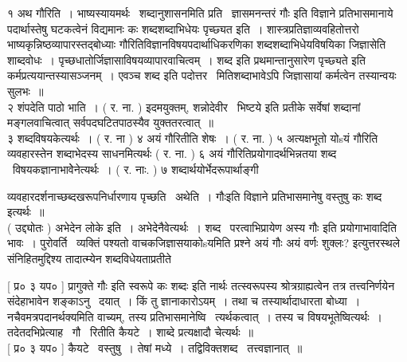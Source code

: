 \documentclass[11pt, openany]{book}
\begin{document}
\begin{multicols}{2}
१ अथ गौरिति~। भाष्यस्यायमर्थः \textendash\ शब्दानुशासनमिति प्रति \textendash\ ज्ञासमनन्तरं {\qt गौः} इति विज्ञाने प्रतिभासमानाये पदार्थास्तेषु घटकत्वेनं विद्यमानः कः शब्दशब्दाभिधेयः पृच्छ्यत इति~। शास्त्रप्रतिज्ञाव्यवहितोत्तरो भाष्यकृन्निष्ठव्यापारस्तद्बोध्याः गौरितिविज्ञानविषयपदार्थाधिकरणिका शब्दशब्दाभिधेयविषयिका जिज्ञासेति शाब्दवोधः~। पृच्छधातोर्जिज्ञासाविषयव्यापारवाचित्वम्~। शब्द इति प्रथमान्तानुसारेण {\qt पृच्छ्यते} इति कर्मप्रत्ययान्तस्यासञ्जनम्~। एवञ्च शब्द इति पदोत्तर \textendash\ मितिशब्दाभावेऽपि जिज्ञासायां कर्मत्वेन तस्यान्वयः सुलभः~॥\\

२ शंपदेति पाठो भाति~। ( र. ना. ) इदमयुक्तम्, {\qt शन्नोदेवीर \textendash\ भिष्टये} इति प्रतीके सर्वेषां शब्दानां मङ्गलवाचित्वात् {\qt सर्व}पदघटितपाठस्यैव युक्ततरत्वात्~॥\\

३ शब्दविषयकेत्यर्थः~। ( र. ना ) ४ अयं गौरितीति शेषः~। ( र. ना. ) ५ अत्यक्षभूतो योsयं गौरिति व्यवहारस्तेन शब्दाभेदस्य साधनमित्यर्थः ( र. ना. ) ६ अयं गौरितिप्रयोगादर्थभिन्नतया शब्द \textendash\ विषयकज्ञानाभावेेनेत्यर्थः~। ( र. नाः. ) ७ शब्दार्थयोर्भेदरूपार्थाङ्गी \textendash\ 

\columnbreak

\noindent
व्यवहारदर्शनाच्छब्दखरूपनिर्धारणाय पृच्छति \textendash\ अथेति~। गौःइति विज्ञाने प्रतिभासमानेषु वस्तुषु कः शब्द इत्यर्थः~॥\\

 ( उद्द्योतः ) अभेदेन लोके इति~। अभेदेनैवेत्यर्थः~। शब्द \textendash\ परत्वाभिप्रायेण {\qt अस्य गौः} इति प्रयोगाभावादिति भावः~। पुरोवर्ति \textendash\ व्यक्तिं पश्यतो वाचकजिज्ञासयाकोsयमिति प्रश्ने अयं गौः {\qt अयं वर्णः शुक्लः?} इत्युत्तरस्थले संनिहितमुद्दिश्य तादात्म्येन शब्दविधेयताप्रतीते \textendash\

 [ प्र० ३ यप० ] प्रागुक्ते {\qt गौः} इति स्वरूपे कः शब्दः इति नार्थः तत्स्वरूपस्य श्रोत्रग्राह्यत्वेन तत्र तत्त्वनिर्णयेन संदेहाभावेन शङ्काऽनु \textendash\ दयात्~। किं तु ज्ञानाकारोऽयम्~। तथा च तस्यार्थादाधारता बोध्या~। नचैवमत्रपदानर्थक्यमिति वाच्यम्, तस्य प्रतिभासमानेष्वि \textendash\ त्यर्थकत्वात्~। तस्य च विषयभूतेष्वित्यर्थः~। तदेतदभिप्रेत्याह \textendash\ गौ \textendash\ रितीति कैयटे~। शाब्दे प्रत्यक्षादौ चेत्यर्थः~॥\\

 [ प्र० ३ यप० ] कैयटे \textendash\ वस्तुषु~। तेषां मध्ये~। तद्विविक्तशब्द \textendash\ तत्त्वज्ञानात्~॥\\


\end{multicols}
\end{document}
